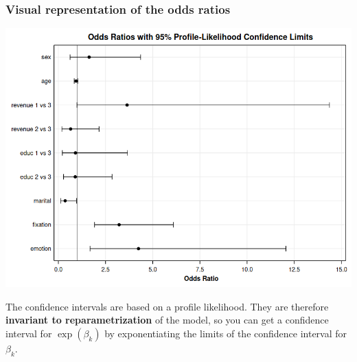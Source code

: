 \documentclass{beamer}
\begin{document}
\begin{frame}[fragile]
\frametitle{Visual representation of the odds ratios}
\begin{center}
\includegraphics[width = 0.8\linewidth]{img/c4/slides8-e16}

\end{center}
{\footnotesize 


The confidence intervals are based on a profile likelihood.
They are therefore \textbf{invariant to reparametrization} of the model, so you can get a confidence interval for $\exp(\beta_k)$ by exponentiating the limits of the confidence interval for $\beta_k$.

}
\end{frame}
\end{document}
